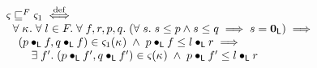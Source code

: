 %	
%
\begin{definition}
%
\[
\begin{array}{l}
%		
		
	\amod{} \weakenI{F}  \amod{1} \iffdef \\
	\hspace*{0.2cm}\for{\ca{}} \for{l \in F}  \for{f, r, p, q} (\for{s} s \leq p \land s \leq q \implies s = \unitL) \implies\\
	\hspace*{0.2cm}
	\begin{array}{l}
		(p \composeL f, q \composeL f) \in \amod{1}(\ca{}) 
		\;\land\; p \composeL f \leq l \composeL r \implies \\
		\hspace*{0.4cm}\exsts{f'} (p \composeL f', q \composeL f') \in \amod{}(\ca{}) \;\land\; p \composeL f' \leq l \composeL r \\


\end{array}
\end{array}\]
\end{definition}
